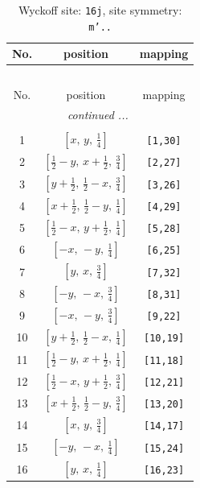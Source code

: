 \documentclass[fleqn,8pt]{jsarticle}
\begin{document}
\renewcommand{\arraystretch}{1.2}
\begin{longtable}{ccc}
\caption{Wyckoff site: {\tt 16j}, site symmetry: {\tt m'..}}
 \\
 \hline \hline
No. & position & mapping \\ \hline \endfirsthead

\multicolumn{2}{l}{\tablename\ \thetable{}} \\
 \hline \hline
No. & position & mapping \\ \hline \endhead

 \hline \hline
\multicolumn{2}{r}{\footnotesize\it continued ...} \\ \endfoot

 \hline \hline
\multicolumn{2}{r}{} \\ \endlastfoot

1 & $\left[ x,\, y,\, \frac{1}{4} \right]$ & {\tt [1,30]} \\ \hline
2 & $\left[ \frac{1}{2} - y,\, x + \frac{1}{2},\, \frac{3}{4} \right]$ & {\tt [2,27]} \\ \hline
3 & $\left[ y + \frac{1}{2},\, \frac{1}{2} - x,\, \frac{3}{4} \right]$ & {\tt [3,26]} \\ \hline
4 & $\left[ x + \frac{1}{2},\, \frac{1}{2} - y,\, \frac{1}{4} \right]$ & {\tt [4,29]} \\ \hline
5 & $\left[ \frac{1}{2} - x,\, y + \frac{1}{2},\, \frac{1}{4} \right]$ & {\tt [5,28]} \\ \hline
6 & $\left[ - x,\, - y,\, \frac{1}{4} \right]$ & {\tt [6,25]} \\ \hline
7 & $\left[ y,\, x,\, \frac{3}{4} \right]$ & {\tt [7,32]} \\ \hline
8 & $\left[ - y,\, - x,\, \frac{3}{4} \right]$ & {\tt [8,31]} \\ \hline
9 & $\left[ - x,\, - y,\, \frac{3}{4} \right]$ & {\tt [9,22]} \\ \hline
10 & $\left[ y + \frac{1}{2},\, \frac{1}{2} - x,\, \frac{1}{4} \right]$ & {\tt [10,19]} \\ \hline
11 & $\left[ \frac{1}{2} - y,\, x + \frac{1}{2},\, \frac{1}{4} \right]$ & {\tt [11,18]} \\ \hline
12 & $\left[ \frac{1}{2} - x,\, y + \frac{1}{2},\, \frac{3}{4} \right]$ & {\tt [12,21]} \\ \hline
13 & $\left[ x + \frac{1}{2},\, \frac{1}{2} - y,\, \frac{3}{4} \right]$ & {\tt [13,20]} \\ \hline
14 & $\left[ x,\, y,\, \frac{3}{4} \right]$ & {\tt [14,17]} \\ \hline
15 & $\left[ - y,\, - x,\, \frac{1}{4} \right]$ & {\tt [15,24]} \\ \hline
16 & $\left[ y,\, x,\, \frac{1}{4} \right]$ & {\tt [16,23]} \\
\end{longtable}
\end{document}

